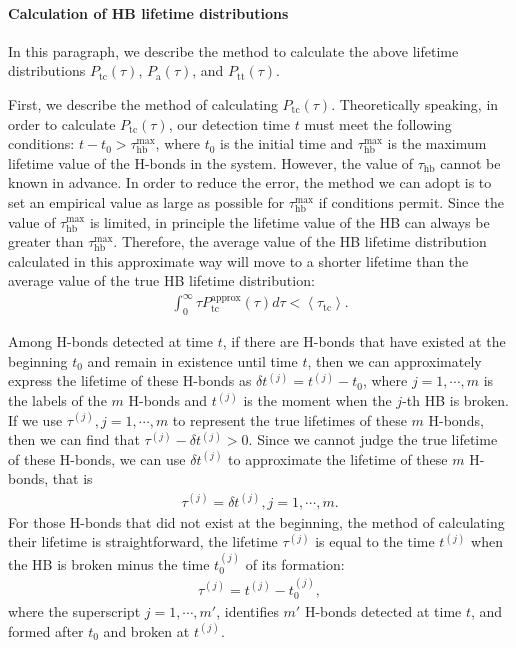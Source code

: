 {\paragraph{Calculation of HB lifetime distributions}
In this paragraph, we describe the method to calculate the above lifetime distributions $P_\text{tc}(\tau)$, $P_\text{a}(\tau)$, and $P_\text{tt}(\tau)$.

First, we describe the method of calculating $P_\text{tc}(\tau)$.
Theoretically speaking, in order to calculate $P_\text{tc}(\tau)$, our detection time $t$ must meet the following conditions: 
$t-t_0 > \tau_\text{hb}^{\max}$, where $t_0$ is the initial time and $\tau_\text{hb}^{\max}$ is the maximum lifetime value of the H-bonds in the system. 
However, the value of $\tau_\text{hb}$ cannot be known in advance. 
In order to reduce the error, the method we can adopt is to set an empirical value as large as possible for
 $\tau_\text{hb}^{\max}$ if conditions permit. Since the value of $\tau_\text{hb}^{\max}$ is limited, in principle the lifetime value of the HB 
can always be greater than $\tau_\text{hb}^{\max}$. 
Therefore, the average value of the HB lifetime distribution 
calculated in this approximate way will move to a shorter lifetime than the average value of the true HB lifetime distribution:
\begin{eqnarray}
\int_{0}^{\infty} \tau P_{\mathrm{tc}}^{\mathrm{approx}}(\tau) d \tau < \left\langle\tau_{\mathrm{tc}}\right\rangle.
\label{eq:upper_bound_1_for_tau_tc}
\end{eqnarray} 

Among H-bonds detected at time $t$, if there are H-bonds that have existed at the beginning $t_0$ and 
remain in existence until time $t$, then we can approximately express the lifetime of these H-bonds as $\delta t^{(j)}=t^{(j)} -t_0$, 
where $j=1,\cdots, m$ is the labels of the $m$ H-bonds and $t^{(j)}$ is the moment when the $j$-th HB is broken. 
If we use $\tau^{(j)},j=1,\cdots,m$ to represent the true lifetimes of these $m$ H-bonds,
then we can find that $\tau^{(j)}-\delta t^{(j)} >0 $.
Since we cannot judge the true lifetime of these H-bonds, we can use $\delta t^{(j)}$ to approximate 
the lifetime of these $m$ H-bonds, that is
\begin{eqnarray}
\tau^{(j)} = \delta t^{(j)}, j=1,\cdots,m.
\end{eqnarray}
For those H-bonds that did not exist at the beginning, the method of calculating their lifetime is straightforward, 
the lifetime $\tau^{(j)}$ is equal to the time $t^{(j)}$ when the HB is broken minus the time $t^{{(j)}}_0$ of its formation:
\begin{eqnarray}
\tau^{(j)} = t^{(j)} - t^{(j)}_0,
\end{eqnarray} 
where the superscript $j = 1, \cdots, m'$, identifies $m'$ H-bonds 
detected at time $t$, and
formed after $t_0$ and broken at $t^{(j)}$.

}
